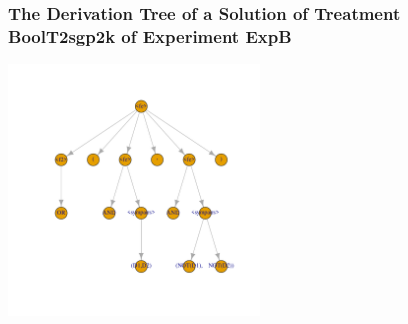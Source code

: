  \begin{frame}
 \frametitle{ The Derivation Tree of a Solution of Treatment BoolT2sgp2k of Experiment ExpB }
 \begin{center}
\includegraphics[width=0.5\textwidth, angle=0]
{ExpBDerivationTreeFigure010.pdf}
 \end{center}
 \label{report/ExpBDerivationTreeFigure010.pdf}  
 \end{frame}

